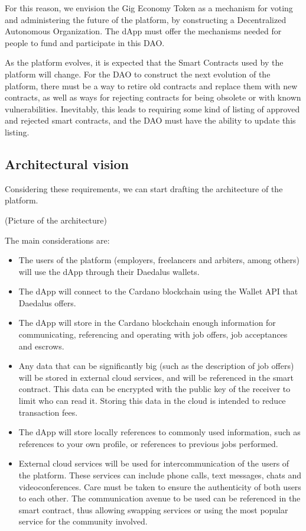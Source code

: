 \documentclass{article}
\begin{document}
For this reason, we envision the Gig Economy Token as a mechanism for voting and administering the future of the platform, by constructing a Decentralized Autonomous Organization. The dApp must offer the mechanisms needed for people to fund and participate in this DAO.

As the platform evolves, it is expected that the Smart Contracts used by the platform will change. For the DAO to construct the next evolution of the platform, there must be a way to retire old contracts and replace them with new contracts, as well as ways for rejecting contracts for being obsolete or with known vulnerabilities. Inevitably, this leads to requiring some kind of listing of approved and rejected smart contracts, and the DAO must have the ability to update this listing.

\subsection{Architectural vision}

Considering these requirements, we can start drafting the architecture of the platform.


(Picture of the architecture)
%

The main considerations are:
\begin{itemize}
  \item The users of the platform (employers, freelancers and arbiters, among others) will use the dApp through their Daedalus wallets.
  \item The dApp will connect to the Cardano blockchain using the Wallet API that Daedalus offers.
  \item The dApp will store in the Cardano blockchain enough information for communicating, referencing and operating with job offers, job acceptances and escrows.
  \item Any data that can be significantly big (such as the description of job offers) will be stored in external cloud services, and will be referenced in the smart contract. This data can be encrypted with the public key of the receiver to limit who can read it. Storing this data in the cloud is intended to reduce transaction fees.
  \item The dApp will store locally references to commonly used information, such as references to your own profile, or references to previous jobs performed.
  \item External cloud services will be used for intercommunication of the users of the platform. These services can include phone calls, text messages, chats and videoconferences. Care must be taken to ensure the authenticity of both users to each other. The communication avenue to be used can be referenced in the smart contract, thus allowing swapping services or using the most popular service for the community involved.
\end{itemize}
\end{document}
